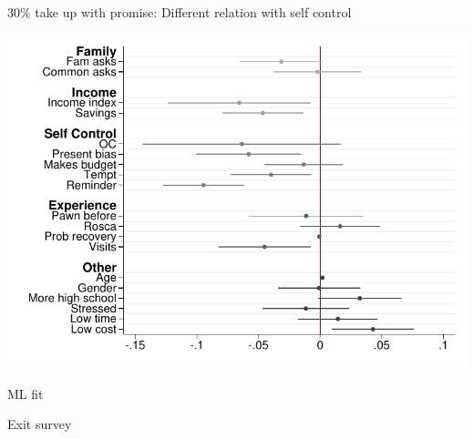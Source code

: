 \documentclass[9pt]{beamer}
\begin{document}
\begin{frame}{30\% take up with promise: Different relation with self control}
    \begin{center}
        \includegraphics[width=.90\textwidth]{Figuras/pago_frec_vol_promise_interactions_rf.pdf}
    \end{center}
\end{frame}


\begin{frame}{ML fit}
    \begin{center}
    \scriptsize
    
    \end{center}
\end{frame}




\begin{frame}{Exit survey}
    \begin{center}
    \tiny
    
    \end{center}
\end{frame}
\end{document}
